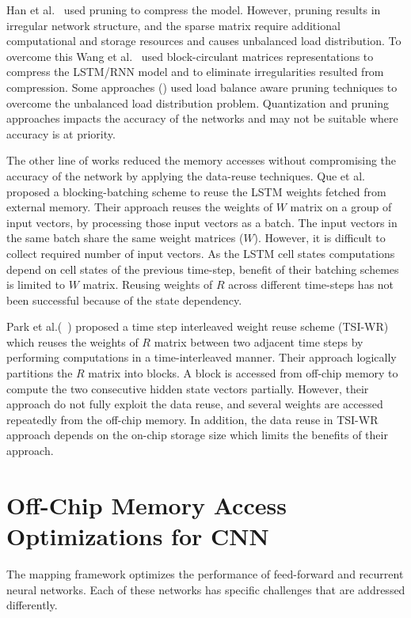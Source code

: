 \documentclass[a4paper,10pt]{article}
\begin{document}
Han et al.~\cite{han2017ese} used pruning to compress the model. However, pruning results in irregular network structure, and the sparse matrix require additional computational and storage resources and causes unbalanced load distribution. To overcome this Wang et al.~\cite{wang2018c} used block-circulant matrices representations to compress the LSTM/RNN model and to eliminate irregularities resulted from compression. Some approaches (\cite{park2019balancing,han2017ese,park2018maximizing}) used load balance aware pruning techniques to overcome the unbalanced load distribution problem. Quantization and pruning approaches impacts the accuracy of the networks and may not be suitable where accuracy is at priority. 

The other line of works reduced the memory accesses without compromising the accuracy of the network by applying the data-reuse techniques. Que et al.~\cite{que2019efficient} proposed a blocking-batching scheme to reuse the LSTM weights fetched from external memory. Their approach reuses the weights of $W$ matrix on a group of input vectors, by processing those input vectors as a batch. The input vectors in the same batch share the same weight matrices ($W$). However, it is difficult to collect required number of input vectors. As the LSTM cell states computations depend on cell states of the previous time-step, benefit of their batching schemes is limited to $W$ matrix. Reusing weights of $R$ across different time-steps has not been successful because of the state dependency.

Park et al.(~\cite{park2020time}) proposed a time step interleaved weight reuse scheme (TSI-WR) which reuses the weights of $R$ matrix between two adjacent time steps by performing computations in a time-interleaved manner. Their approach logically partitions the $R$ matrix into blocks. A block is accessed from off-chip memory to compute the two consecutive hidden state vectors partially. However, their approach do not fully exploit the data reuse, and several weights are accessed repeatedly from the off-chip memory. In addition, the data reuse in TSI-WR approach depends on the on-chip storage size which limits the benefits of their approach.

\section{Off-Chip Memory Access Optimizations for CNN}
The mapping framework optimizes the performance of feed-forward and recurrent neural networks. Each of these networks has specific challenges that are addressed differently. 
\end{document}
